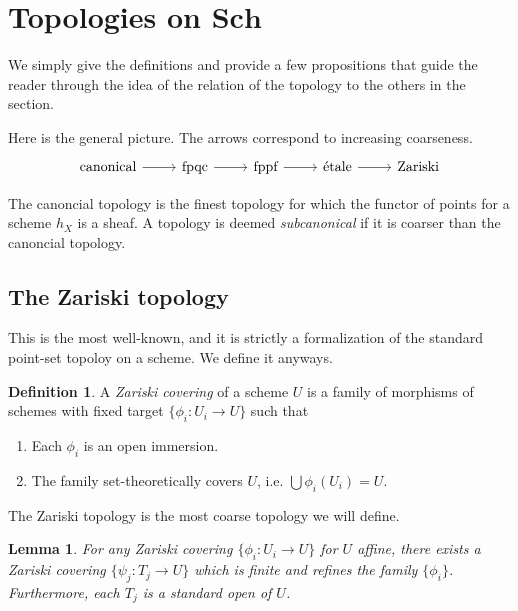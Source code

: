 \documentclass{amsart}
\newcommand{\Sch}{\mathbf{Sch}}
\newtheorem{lemma}[theorem]{Lemma}
\theoremstyle{definition}
\newtheorem{definition}[theorem]{Definition}
\theoremstyle{remark}
\begin{document}
\section{Topologies on $\Sch$}

We simply give the definitions and provide a few propositions that guide the
reader through the idea of the relation of the topology to the others in the
section.

Here is the general picture. The arrows correspond to increasing coarseness.
\[
    \begin{tikzcd}
        \text{canonical} \ar[r] &
        \text{fpqc} \ar[r] &
        \text{fppf} \ar[r] &
        \text{\'etale} \ar[r] &
        \text{Zariski}
    \end{tikzcd}
\]

The canoncial topology is the finest topology for which the functor of points
for a scheme $h_X$ is a sheaf. A topology is deemed \textit{subcanonical} if it
is coarser than the canoncial topology.

\subsection{The Zariski topology}

This is the most well-known, and it is strictly a formalization of the standard
point-set topoloy on a scheme. We define it anyways.

\begin{definition}
    A \textit{Zariski covering} of a scheme $U$ is a family of morphisms of
    schemes with fixed target $\{\phi_i : U_i \to U\}$ such that
    \begin{enumerate}
        \item Each $\phi_i$ is an open immersion.
        \item The family set-theoretically covers $U$, i.e. $\bigcup \phi_i(U_i)
            = U$.
    \end{enumerate}
\end{definition}

The Zariski topology is the most coarse topology we will define.

\begin{lemma}
    For any Zariski covering $\{\phi_i : U_i \to U\}$ for $U$ affine, there
    exists a Zariski covering $\{\psi_j : T_j \to U\}$ which is finite and
    refines the family $\{\phi_i\}$. Furthermore, each $T_j$ is a standard open
    of $U$.
\end{lemma}
\end{document}
